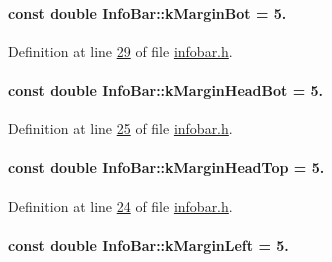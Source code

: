 \paragraph[{k\+Margin\+Bot}]{\setlength{\rightskip}{0pt plus 5cm}const double Info\+Bar\+::k\+Margin\+Bot = 5.\hspace{0.3cm}{\ttfamily [static]}}\label{class_info_bar_a18194bb46d36b00aa9f0d01f24a87617}


Definition at line \hyperlink{infobar_8h_source_l00029}{29} of file \hyperlink{infobar_8h_source}{infobar.\+h}.

\hypertarget{class_info_bar_aed15b9f28cc4a43d509c3553b032fa5e}{}
\paragraph[{k\+Margin\+Head\+Bot}]{\setlength{\rightskip}{0pt plus 5cm}const double Info\+Bar\+::k\+Margin\+Head\+Bot = 5.\hspace{0.3cm}{\ttfamily [static]}}\label{class_info_bar_aed15b9f28cc4a43d509c3553b032fa5e}


Definition at line \hyperlink{infobar_8h_source_l00025}{25} of file \hyperlink{infobar_8h_source}{infobar.\+h}.

\hypertarget{class_info_bar_ae4ec64a4c58d29eb6c7378b4621bc6c2}{}
\paragraph[{k\+Margin\+Head\+Top}]{\setlength{\rightskip}{0pt plus 5cm}const double Info\+Bar\+::k\+Margin\+Head\+Top = 5.\hspace{0.3cm}{\ttfamily [static]}}\label{class_info_bar_ae4ec64a4c58d29eb6c7378b4621bc6c2}


Definition at line \hyperlink{infobar_8h_source_l00024}{24} of file \hyperlink{infobar_8h_source}{infobar.\+h}.

\hypertarget{class_info_bar_a2ed246fc7b7917ba8141b55cbd023d5c}{}
\paragraph[{k\+Margin\+Left}]{\setlength{\rightskip}{0pt plus 5cm}const double Info\+Bar\+::k\+Margin\+Left = 5.\hspace{0.3cm}{\ttfamily [static]}}\label{class_info_bar_a2ed246fc7b7917ba8141b55cbd023d5c}


